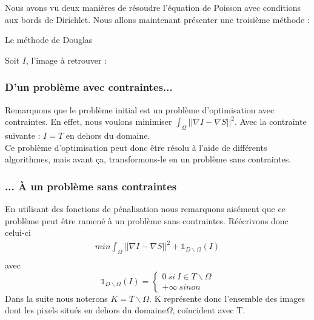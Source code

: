 Nous avons vu deux manières de résoudre l'équation de Poisson avec conditions aux bords de Dirichlet. Nous allons maintenant présenter une troisième méthode  : \\
\begin{center}
Le méthode de Douglas
\end{center}
Soit $I$, l'image à retrouver : 
\subsubsection{D'un problème avec contraintes...}
Remarquons que le problème initial est un problème d'optimisation avec contraintes. En effet, nous voulons minimiser $\int_\Omega ||\nabla I-\nabla S||^2$. Avec la contrainte suivante : $I = T$ en dehors du domaine. \\
Ce problème d'optimisation peut donc être résolu à l'aide de différents algorithmes, mais avant ça, transformons-le en un problème sans contraintes. 

\subsubsection{... À un problème sans contraintes}
En utilisant des fonctions de pénalisation nous remarquons aisément que ce problème peut être ramené à un problème sans contraintes. Réécrivons donc celui-ci 
\begin{equation*}
\begin{aligned}{}
    min \int_\Omega ||\nabla I - \nabla S||^2 + \mathbb{1} _{D \backslash \Omega } (I) \\
    \end{aligned}
\end{equation*}{}
avec 
\begin{equation*}
\mathbb{1}_{ D \backslash \Omega }(I) =
	\left\{
	\begin{aligned}{}
	0 \ si\  I \in T \backslash \Omega \\
	+ \infty \ sinon
    \end{aligned}
    \right.
\end{equation*}{}
Dans la suite nous noterons $K = T\backslash \Omega$. K représente donc l'ensemble des images dont les pixels situés en dehors du domaine$\Omega$, coïncident avec T.\\

